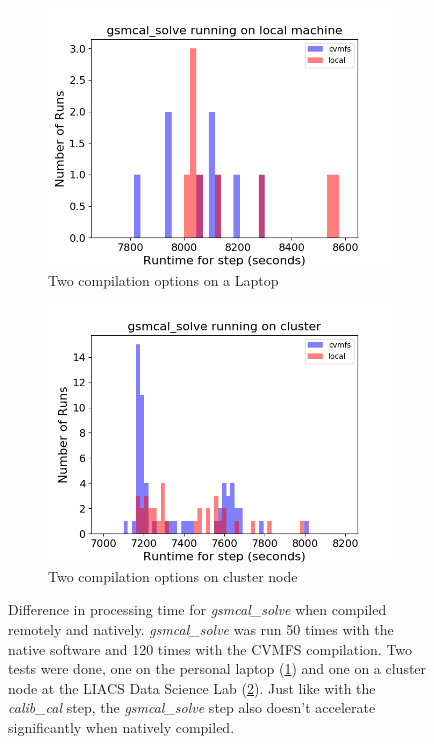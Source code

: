 \begin{figure}
  \centering
     \begin{subfigure}{.45\linewidth}
    \includegraphics[width=\linewidth]{ch4/figures/ppr2_gsm_local.png}
    \caption{Two compilation options on a Laptop}
	\label{fig:ch4_cmvfs1_gsmcal}
    \end{subfigure}%
    \begin{subfigure}{.45\linewidth}
     \includegraphics[width=\linewidth]{ch4/figures/ppr2_gsm_cluster.png}
    \caption{Two compilation options on cluster node}
	\label{fig:ch4_cmvfs2_gsmcal}
    \end{subfigure}%
      \caption[Speed comparison between natively and remotely compiled software for the 'gsmcal\_solve' step.]{Difference in processing time for \textit{gsmcal\_solve} when compiled remotely and natively. \textit{gsmcal\_solve} was run 50 times with the native software and 120 times with the CVMFS compilation. Two tests were done, one on the personal laptop (\ref{fig:ch4_cmvfs1_gsmcal}) and one on a cluster node at the LIACS Data Science Lab (\ref{fig:ch4_cmvfs2_gsmcal}). Just like with the \textit{calib\_cal} step, the \textit{gsmcal\_solve} step also doesn't accelerate significantly when natively compiled.} 
	\label{fig:ch4_cvmfs_native_gsm}
\end{figure}

